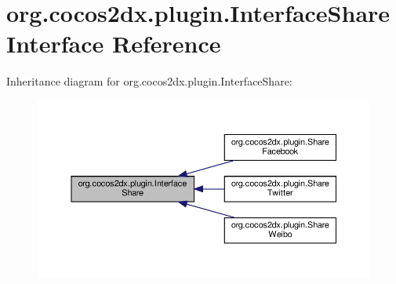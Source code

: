 \hypertarget{interfaceorg_1_1cocos2dx_1_1plugin_1_1InterfaceShare}{}\section{org.\+cocos2dx.\+plugin.\+Interface\+Share Interface Reference}
\label{interfaceorg_1_1cocos2dx_1_1plugin_1_1InterfaceShare}


Inheritance diagram for org.\+cocos2dx.\+plugin.\+Interface\+Share\+:
\nopagebreak
\begin{figure}[H]
\begin{center}
\leavevmode
\includegraphics[width=350pt]{interfaceorg_1_1cocos2dx_1_1plugin_1_1InterfaceShare__inherit__graph}
\end{center}
\end{figure}
